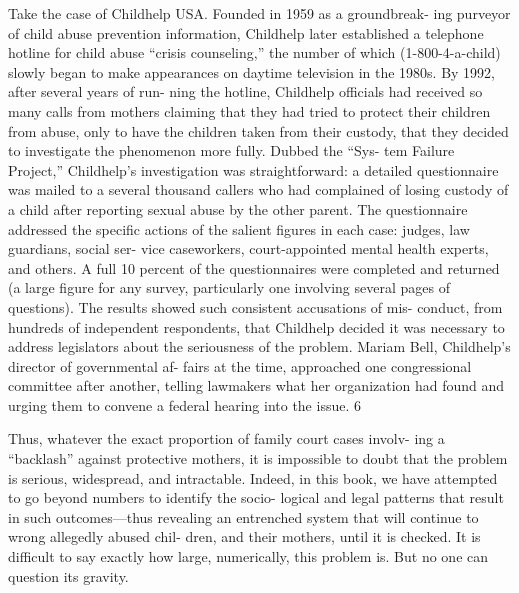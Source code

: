 Take the case of Childhelp USA. Founded in 1959 as a groundbreak-
ing purveyor of child abuse prevention information, Childhelp later
established a telephone hotline for child abuse “crisis counseling,” the
number of which (1-800-4-a-child) slowly began to make appearances
on daytime television in the 1980s. By 1992, after several years of run-
ning the hotline, Childhelp officials had received so many calls from
mothers claiming that they had tried to protect their children from
abuse, only to have the children taken from their custody, that they
decided to investigate the phenomenon more fully. Dubbed the “Sys-
tem Failure Project,” Childhelp’s investigation was straightforward: a
detailed questionnaire was mailed to a several thousand callers who
had complained of losing custody of a child after reporting sexual abuse
by the other parent. The questionnaire addressed the specific actions
of the salient figures in each case: judges, law guardians, social ser-
vice caseworkers, court-appointed mental health experts, and others.
A full 10 percent of the questionnaires were completed and returned
(a large figure for any survey, particularly one involving several pages
of questions). The results showed such consistent accusations of mis-
conduct, from hundreds of independent respondents, that Childhelp
decided it was necessary to address legislators about the seriousness
of the problem. Mariam Bell, Childhelp’s director of governmental af-
fairs at the time, approached one congressional committee after another,
telling lawmakers what her organization had found and urging them to
convene a federal hearing into the issue. 6 \pfl{}


Thus, whatever the exact proportion of family court cases involv-
ing a “backlash” against protective mothers, it is impossible to doubt
that the problem is serious, widespread, and intractable. Indeed, in this
book, we have attempted to go beyond numbers to identify the socio-
logical and legal patterns that result in such outcomes—thus revealing
an entrenched system that will continue to wrong allegedly abused chil-
dren, and their mothers, until it is checked. It is difficult to say exactly
how large, numerically, this problem is. But no one can question its
gravity. \pfl{}


